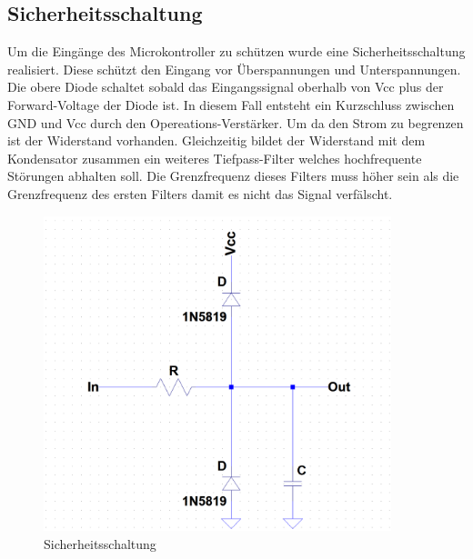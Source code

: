 \subsection{Sicherheitsschaltung}
\begin{minipage}[h]{0.5\textwidth} 
Um die Eingänge des Microkontroller zu schützen wurde eine Sicherheitsschaltung realisiert. Diese schützt den Eingang vor Überspannungen und Unterspannungen. Die obere Diode schaltet sobald das Eingangssignal oberhalb von Vcc plus der Forward-Voltage der Diode ist. In diesem Fall entsteht ein Kurzschluss zwischen GND und Vcc durch den Opereations-Verstärker. Um da den Strom zu begrenzen ist der Widerstand vorhanden. Gleichzeitig bildet der Widerstand mit dem Kondensator zusammen ein weiteres Tiefpass-Filter welches hochfrequente Störungen abhalten soll.  Die Grenzfrequenz dieses Filters muss höher sein als die Grenzfrequenz des ersten Filters damit es nicht das Signal verfälscht.
\end{minipage}
\begin{minipage}[h]{0.5\textwidth} 
\begin{figure}[H]
\begin{center}
\includegraphics[width=0.9\textwidth]{images/Analoge_Schaltung_Sicherung.png}
\caption{Sicherheitsschaltung}
\end{center}
\end{figure}
\end{minipage}